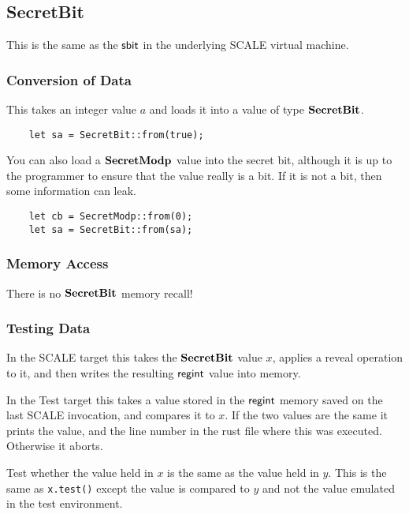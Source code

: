 \subsection{SecretBit}
This is the same as the $\mathsf{sbit}$ in the underlying SCALE virtual machine.

\subsubsection{Conversion of Data}
This takes an integer value $a$ and loads it into a value
of type $\mathbf{SecretBit}$.
\begin{lstlisting}
    let sa = SecretBit::from(true);
\end{lstlisting}
You can also load a $\mathbf{SecretModp}$ value into the secret bit,
although it is up to the programmer to ensure that
the value really is a bit. If it is not a bit, then some
information can leak.
\begin{lstlisting}
    let cb = SecretModp::from(0);
    let sa = SecretBit::from(sa);
\end{lstlisting}


\subsubsection{Memory Access}
There is no $\mathbf{SecretBit}$ memory recall!

\subsubsection{Testing Data}
In the SCALE target this takes the $\mathbf{SecretBit}$ value $x$,
applies a reveal operation to it, and then writes the
resulting $\mathsf{regint}$ value into memory.

In the Test target this takes a value stored in the $\mathsf{regint}$
memory saved on the last SCALE invocation, and compares it to
$x$. If the two values are the same it prints the value, and the
line number in the rust file where this was executed.
Otherwise it aborts.

Test whether the value held in $x$ is the same as the value held in $y$.
This is the same as \verb|x.test()| except the value is compared to
$y$ and not the value emulated in the test environment.
